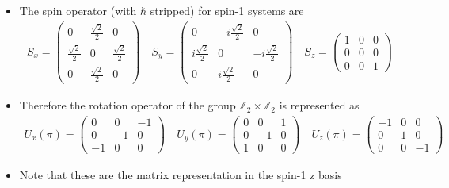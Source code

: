 \documentclass[aspectratio=169,xcolor=dvipsnames, t]{beamer}
\begin{document}
\begin{frame}
    \begin{itemize}
        \item The spin operator (with $\hbar$ stripped) for spin-1 systems are
        \begin{align*}
            S_x = \begin{pmatrix}
                0 & \frac{\sqrt{2}}{2} & 0 \\
                \frac{\sqrt{2}}{2} & 0 & \frac{\sqrt{2}}{2}\\
                0 & \frac{\sqrt{2}}{2} & 0
            \end{pmatrix}\quad S_y = \begin{pmatrix}
                0 & -i\frac{\sqrt{2}}{2} & 0 \\
                i\frac{\sqrt{2}}{2} & 0 & -i\frac{\sqrt{2}}{2}\\
                0 & i\frac{\sqrt{2}}{2} & 0
            \end{pmatrix} \quad S_z = \begin{pmatrix}
                1 & 0 & 0\\
                0 & 0 & 0\\
                0 & 0 & 1 
            \end{pmatrix}
        \end{align*}\vspace{1mm}
        \item Therefore the rotation operator of the group $\mathbb Z_2 \times \mathbb Z_2$ is represented as 
        \begin{align*}
            U_x(\pi) = \begin{pmatrix}
                0 & 0 & -1 \\
                0 & -1 & 0\\
                -1 & 0 & 0
            \end{pmatrix}\quad U_y(\pi) = \begin{pmatrix}
                0 & 0 & 1 \\
                0 & -1 &  0\\
                1 & 0 & 0
            \end{pmatrix}\quad U_z(\pi) =\begin{pmatrix}
                -1 & 0 & 0\\
                0 & 1 & 0\\
                0 & 0 & -1 
            \end{pmatrix}
        \end{align*}
        \item Note that these are the matrix representation in the spin-1 z basis
    \end{itemize}
\end{frame}
\end{document}
